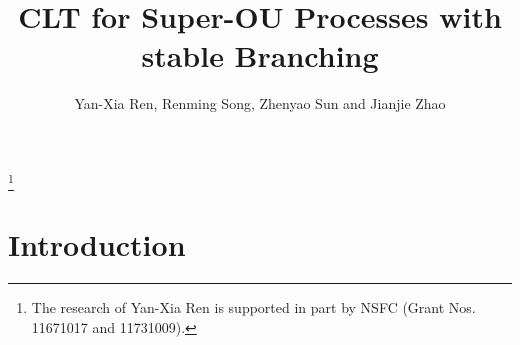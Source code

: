 \documentclass[12pt,oneside,english]{amsart}
\theoremstyle{plain}
\theoremstyle{definition}
\numberwithin{equation}{section}
\begin{document}
\title
    [CLT for Super-OU processes]
    {CLT for Super-OU Processes with stable Branching}
\author
    [Y.-X. Ren, R. Song, Z. Sun and J. Zhao]
    {Yan-Xia Ren, Renming Song, Zhenyao Sun and Jianjie Zhao}
\address
    {Yan-Xia Ren\\
    School of Mathematical Sciences\\
    Peking University\\
    Beijing, P. R. China, 100871}
\thanks{The research of Yan-Xia Ren is supported in part by NSFC (Grant Nos. 11671017  and 11731009).}
\address
    {Zhenyao Sun\\
    School of Mathematical Sciences\\
    Peking University\\
    Beijing, P. R. China, 100871}
\address
    {Jianjie Zhao\\
    School of Mathematical Sciences\\
    Peking University\\
    Beijing, P. R. China, 100871}
\maketitle
\section{Introduction}
\end{document}

